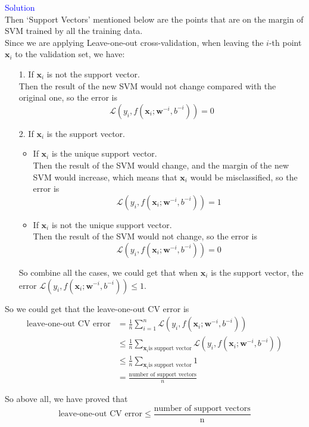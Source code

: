 \textcolor{blue}{Solution}\\
Then `Support Vectors' mentioned below are the points that are on the margin of SVM trained by all the training data.\\
Since we are applying Leave-one-out cross-validation, when leaving the $i$-th point $\mathbf{x}_i$ to the validation set, we have:
\begin{itemize}
    \item[1.] If $\mathbf{x}_i$ is not the support vector.\\
    Then the result of the new SVM would not change compared with the original one, so the error is $$\mathcal{L}(y_i,f(\mathbf{x}_i;\mathbf{w}^{-i},b^{-i}))=0$$

    \item[2.] If $\mathbf{x}_i$ is the support vector.
    \begin{itemize}
        \item If $\mathbf{x}_i$ is the unique support vector.\\
        Then the result of the SVM would change, and the margin of the new SVM would increase, which means that $\mathbf{x}_i$ would be misclassified, so the error is $$\mathcal{L}(y_i,f(\mathbf{x}_i;\mathbf{w}^{-i},b^{-i}))=1$$
        \item If $\mathbf{x}_i$ is not the unique support vector.\\
        Then the result of the SVM would not change, so the error is $$\mathcal{L}(y_i,f(\mathbf{x}_i;\mathbf{w}^{-i},b^{-i}))=0$$
    \end{itemize}
    So combine all the cases, we could get that when $\mathbf{x}_i$ is the support vector, the error $\mathcal{L}(y_i,f(\mathbf{x}_i;\mathbf{w}^{-i},b^{-i}))\leq 1$.
\end{itemize}
So we could get that the leave-one-out CV error is
\begin{align*}
    \text{leave-one-out CV error} &= \frac{1}{n}\sum_{i=1}^n\mathcal{L}(y_i,f(\mathbf{x}_i;\mathbf{w}^{-i},b^{-i})) \\
    &\leq \frac{1}{n}\sum_{\mathbf{x}_i \text{is support vector}} \mathcal{L}(y_i,f(\mathbf{x}_i;\mathbf{w}^{-i},b^{-i})) \\
    &\leq \frac{1}{n}\sum_{\mathbf{x}_i \text{is support vector}} 1 \\
    &= \frac{\text{number of support vectors}}{n}
\end{align*}

So above all, we have proved that
$$\text{leave-one-out CV error}\leq \frac{\text{number of support vectors}}{\text{n}}$$

\newpage